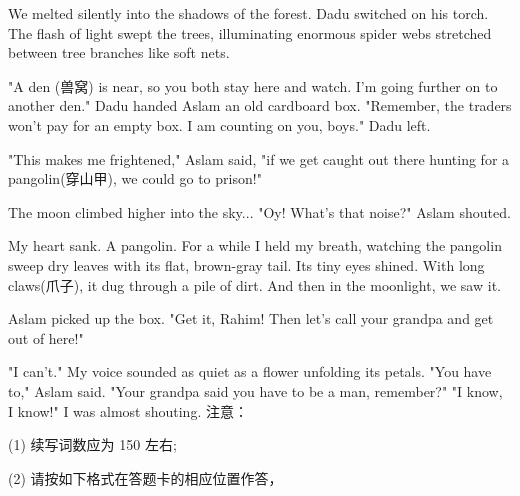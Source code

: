 \documentclass{英语试卷}
\begin{document}
\par We melted silently into the shadows of the forest. Dadu switched on his torch. The flash of light swept the trees, illuminating enormous spider webs stretched between tree branches like soft nets.\par
\par "A den (兽窝) is near, so you both stay here and watch. I’m going further on to another den." Dadu handed Aslam an old cardboard box. "Remember, the traders won’t pay for an empty box. I am counting on you, boys." Dadu left.\par
\par "This makes me frightened," Aslam said, "if we get caught out there hunting for a pangolin(穿山甲), we could go to prison!"\par
\par The moon climbed higher into the sky... "Oy! What's that noise?" Aslam shouted.\par
\par My heart sank. A pangolin. For a while I held my breath, watching the pangolin sweep dry leaves with its flat, brown-gray tail. Its tiny eyes shined. With long claws(爪子), it dug through a pile of dirt. And then in the moonlight, we saw it.\par
\par Aslam picked up the box. "Get it, Rahim! Then let's call your grandpa and get out of here!"\par
\par "I can’t." My voice sounded as quiet as a flower unfolding its petals. "You have to," Aslam said. "Your grandpa said you have to be a man, remember?" "I know, I know!" I was almost shouting. 注意：\par
\par (1) 续写词数应为 150 左右;\par
\par (2) 请按如下格式在答题卡的相应位置作答，\par
{}
\end{document}
